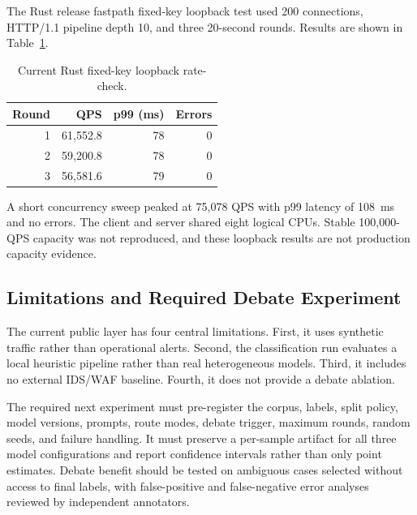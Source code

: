 The Rust release fastpath fixed-key loopback test used 200 connections, HTTP/1.1 pipeline depth 10, and three 20-second rounds. Results are shown in Table~\ref{tab:fastpath-current}.

\begin{table}[t]
  \centering
  \footnotesize
  \caption{Current Rust fixed-key loopback rate-check.}
  \label{tab:fastpath-current}
  \begin{tabular}{@{}rrrr@{}}
    \toprule
    Round & QPS & p99 (ms) & Errors \\
    \midrule
    1 & 61,552.8 & 78 & 0 \\
    2 & 59,200.8 & 78 & 0 \\
    3 & 56,581.6 & 79 & 0 \\
    \bottomrule
  \end{tabular}
\end{table}

A short concurrency sweep peaked at 75,078 QPS with p99 latency of 108~ms and no errors. The client and server shared eight logical CPUs. Stable 100,000-QPS capacity was not reproduced, and these loopback results are not production capacity evidence.

\subsection{Limitations and Required Debate Experiment}

The current public layer has four central limitations. First, it uses synthetic traffic rather than operational alerts. Second, the classification run evaluates a local heuristic pipeline rather than real heterogeneous models. Third, it includes no external IDS/WAF baseline. Fourth, it does not provide a debate ablation.

The required next experiment must pre-register the corpus, labels, split policy, model versions, prompts, route modes, debate trigger, maximum rounds, random seeds, and failure handling. It must preserve a per-sample artifact for all three model configurations and report confidence intervals rather than only point estimates. Debate benefit should be tested on ambiguous cases selected without access to final labels, with false-positive and false-negative error analyses reviewed by independent annotators.

